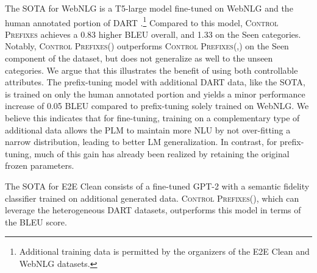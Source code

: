 \documentclass[11pt]{article}
\newcommand{\control}{\textsc{Control Prefixes}\xspace}
\begin{document}
The SOTA for WebNLG is a T5-large model fine-tuned on WebNLG and the human annotated portion of DART \citep{dart}.\footnote{Additional training data is permitted by the organizers of the E2E Clean and WebNLG datasets.} Compared to this model, \control achieves a 0.83 higher BLEU overall, and 1.33 on the Seen categories. Notably, \control () outperforms
\control (,) on the Seen component of the dataset, but does not
generalize as well to the unseen categories. We argue that this illustrates the benefit of using both controllable attributes. The prefix-tuning model with additional DART data, like the SOTA, is trained on only the human annotated portion and yields a minor performance increase of 0.05 BLEU compared to prefix-tuning solely trained on WebNLG. We believe this indicates that for fine-tuning, training on a complementary type of additional data allows the PLM to maintain more NLU by not over-fitting a narrow distribution, leading to better LM generalization. In contrast, for prefix-tuning, much of this gain has already been realized by retaining the original frozen  parameters.


The SOTA \citep{dataturner} for E2E Clean consists of a fine-tuned GPT-2 with a semantic fidelity classifier trained on additional generated data. 
\control (), which can leverage the heterogeneous DART datasets, outperforms this model in terms of the BLEU score.
\end{document}
